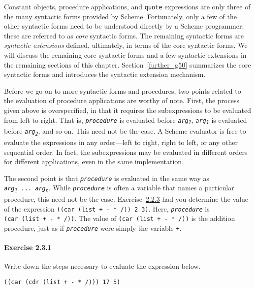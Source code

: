 Constant objects, procedure applications, and \texttt{quote} expressions
are only three of the many syntactic forms provided by Scheme.
Fortunately, only a few of the other syntactic forms need to be
understood directly by a Scheme programmer; these are referred to as
\textit{core} syntactic forms.
The remaining syntactic forms are \label{start_s46}\textit{syntactic extensions}
defined, ultimately, in terms of the \label{start_s47}core syntactic forms.
We will discuss the remaining core syntactic forms and a few
syntactic extensions in the remaining sections of this chapter.
Section \ref{further_g50} summarizes the core syntactic forms and introduces
the syntactic extension mechanism.


Before we go on to more syntactic forms and procedures,
two points related to the evaluation of procedure applications
are worthy of note.
\label{start_s48}First, the process given above is
overspecified, in that it requires the subexpressions to be evaluated
from left to right.
That is, \texttt{\textit{procedure}} is evaluated before \texttt{\textit{arg\textsubscript{1}}},
\texttt{\textit{arg\textsubscript{1}}} is evaluated before \texttt{\textit{arg\textsubscript{2}}}, and so on.
This need not be the case.
A Scheme evaluator is free to evaluate the expressions in
any order---left to right, right to left, or any other sequential
order.
In fact, the subexpressions may be evaluated in different orders
for different applications, even in the same implementation.


The second point is that \texttt{\textit{procedure}} is evaluated in the
same way as \texttt{\textit{arg\textsubscript{1}} ... \textit{arg\textsubscript{n}}}.
While \texttt{\textit{procedure}} is often a variable
that names a particular procedure, this need not be the case.
Exercise \hyperref[start_g9]{2.2.3} had you determine
the value of the expression \texttt{((car (list + - * /)) 2 3)}.
Here, \texttt{\textit{procedure}} is \texttt{(car (list + - * /))}.
The value of \texttt{(car (list + - * /))} is the addition procedure,
just as if \texttt{\textit{procedure}} were simply the variable
\texttt{+}.


\paragraph{Exercise \label{start_g16}2.3.1}


\label{start_s49}Write down the steps necessary to evaluate the expression below.


\texttt{((car (cdr (list + - * /))) 17 5)}


